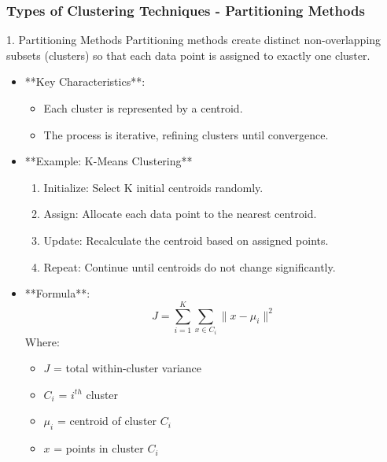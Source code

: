 \documentclass{beamer}
\begin{document}
\begin{frame}[fragile]
    \frametitle{Types of Clustering Techniques - Partitioning Methods}
    \begin{block}{1. Partitioning Methods}
        Partitioning methods create distinct non-overlapping subsets (clusters) so that each data point is assigned to exactly one cluster.
    \end{block}
    
    \begin{itemize}
        \item **Key Characteristics**:
        \begin{itemize}
            \item Each cluster is represented by a centroid.
            \item The process is iterative, refining clusters until convergence.
        \end{itemize}
        
        \item **Example: K-Means Clustering**
        \begin{enumerate}
            \item Initialize: Select K initial centroids randomly.
            \item Assign: Allocate each data point to the nearest centroid.
            \item Update: Recalculate the centroid based on assigned points.
            \item Repeat: Continue until centroids do not change significantly.
        \end{enumerate}
        
        \item **Formula**:
        \begin{equation}
            J = \sum_{i=1}^{K} \sum_{x \in C_i} \|x - \mu_i\|^2
        \end{equation}
        Where:
        \begin{itemize}
            \item \(J\) = total within-cluster variance
            \item \(C_i\) = \(i^{th}\) cluster
            \item \(\mu_i\) = centroid of cluster \(C_i\)
            \item \(x\) = points in cluster \(C_i\)
        \end{itemize}
    \end{itemize}
\end{frame}
\end{document}
